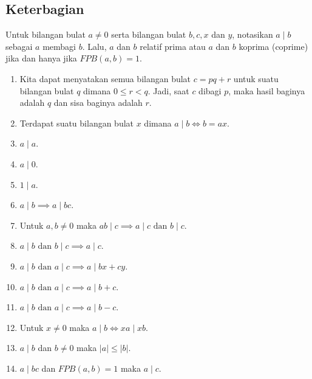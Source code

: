 \subsection{Keterbagian}
    Untuk bilangan bulat $a \neq 0$ serta bilangan bulat $b,c,x$ dan $y$, notasikan $a \mid b$ sebagai $a$ membagi $b$. Lalu, $a$ dan $b$ relatif prima atau $a$ dan $b$ koprima (coprime) jika dan hanya jika $FPB(a,b)=1$.
    \begin{enumerate}
        \item Kita dapat menyatakan semua bilangan bulat $c = pq+r$ untuk suatu bilangan bulat $q$ dimana $0 \le r < q$. Jadi, saat $c$ dibagi $p$, maka hasil baginya adalah $q$ dan sisa baginya adalah $r$.
        \item Terdapat suatu bilangan bulat $x$ dimana $a \mid b \iff b=ax$.
        \item $a \mid a$.
        \item $a \mid 0$.
        \item $1 \mid a$.
        \item $a \mid b \implies a \mid bc$.
        \item Untuk $a,b \neq 0$ maka $ab \mid c \implies a \mid c \text{ dan } b \mid c$.
        \item $a \mid b \text{ dan } b \mid c \implies a \mid c$.
        \item $a \mid b \text{ dan } a \mid c \implies a \mid bx + cy$.
        \item $a \mid b \text{ dan } a \mid c \implies a \mid b+c$.
        \item $a \mid b \text{ dan } a \mid c \implies a \mid b-c$.
        \item Untuk $x \neq 0$ maka $a \mid b \iff xa \mid xb$.
        \item $a \mid b$ dan $b \neq 0$ maka $|a| \le |b|$.
        \item $a \mid bc$ dan $FPB(a,b)=1$ maka $a\mid c$.
    \end{enumerate}


    